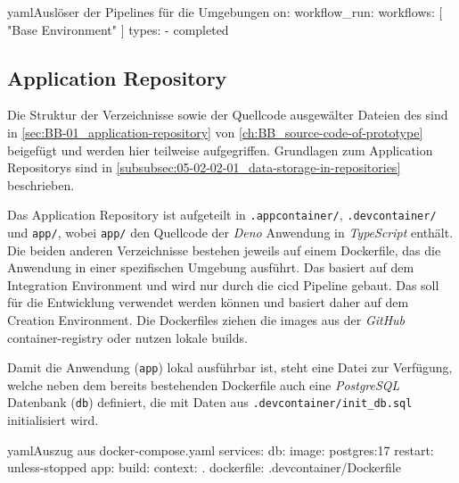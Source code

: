 \begin{codebox}{yaml}{Auslöser der Pipelines für die Umgebungen}
on:
    workflow_run:
        workflows: [ "Base Environment" ]
        types:
            - completed
\end{codebox}

\subsection{Application Repository}
\label{subsec:06-02-03_application-repository}

Die Struktur der Verzeichnisse sowie der Quellcode ausgewälter Dateien des  sind in \autoref{sec:BB-01_application-repository} von \autoref{ch:BB_source-code-of-prototype} beigefügt und werden hier teilweise aufgegriffen. Grundlagen zum Application Repositorys sind in \autoref{subsubsec:05-02-02-01_data-storage-in-repositories} beschrieben.

Das Application Repository ist aufgeteilt in \texttt{.appcontainer/}, \texttt{.devcontainer/} und \texttt{app/}, wobei \texttt{app/} den Quellcode der \textit{Deno} Anwendung in \textit{TypeScript} enthält. Die beiden anderen Verzeichnisse bestehen jeweils auf einem Dockerfile, das die Anwendung in einer spezifischen Umgebung ausführt. Das  basiert auf dem Integration Environment und wird nur durch die \Gls{cicd} Pipeline  gebaut. Das  soll für die Entwicklung verwendet werden können und basiert daher auf dem Creation Environment. Die Dockerfiles ziehen die \Glspl{image} aus der \textit{GitHub} \Gls{container-registry} oder nutzen lokale \Glspl{build}.

Damit die Anwendung (\texttt{app}) lokal ausführbar ist, steht eine  Datei zur Verfügung, welche neben dem bereits bestehenden Dockerfile auch eine \textit{PostgreSQL} Datenbank (\texttt{db}) definiert, die mit Daten aus \texttt{.devcontainer/init\_db.sql} initialisiert wird.

\begin{codebox}{yaml}{Auszug aus docker-compose.yaml}
services:
    db:
        image: postgres:17
        restart: unless-stopped
    app:
        build:
            context: .
            dockerfile: .devcontainer/Dockerfile
\end{codebox}


